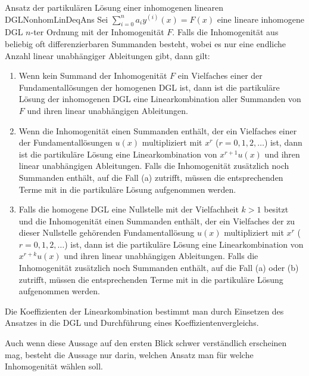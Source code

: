 \begin{statement}{Ansatz der partikulären Lösung einer inhomogenen linearen DGL}{NonhomLinDeqAns}
    Sei $\sum\limits_{i=0}^n a_i y^{(i)}(x) = F(x)$  eine lineare inhomogene DGL $n$-ter Ordnung mit der Inhomogenität $F$. Falls die Inhomogenität aus beliebig oft differenzierbaren Summanden besteht, wobei es nur eine endliche Anzahl linear unabhängiger Ableitungen gibt, dann gilt:
    \begin{enumerate}[label=\alph*)]
        \item Wenn kein Summand der Inhomogenität $F$ ein Vielfaches einer der Fundamentallösungen der homogenen DGL ist, dann ist die partikuläre Lösung der inhomogenen DGL eine Linearkombination aller Summanden von $F$ und ihren linear unabhängigen Ableitungen.
        \item Wenn die Inhomogenität einen Summanden enthält, der ein Vielfaches einer der Fundamentallösungen $u(x)$ multipliziert mit $x^r$ ($r=0,1,2,\dots$) ist, dann ist die partikuläre Lösung eine Linearkombination von $x^{r+1} u(x)$ und ihren linear unabhängigen Ableitungen. Falls die Inhomogenität zusätzlich noch Summanden enthält, auf die Fall (a) zutrifft, müssen die entsprechenden Terme mit in die partikuläre Lösung aufgenommen werden.
        \item Falls die homogene DGL eine Nullstelle mit der Vielfachheit $k>1$ besitzt und die Inhomogenität einen Summanden enthält, der ein Vielfaches der zu dieser Nullstelle gehörenden Fundamentallösung $u(x)$ multipliziert mit $x^r$ ($r=0,1,2,\dots$) ist, dann ist die partikuläre Lösung eine Linearkombination von $x^{r+k} u(x)$ und ihren linear unabhängigen Ableitungen. Falls die Inhomogenität zusätzlich noch Summanden enthält, auf die Fall (a) oder (b) zutrifft, müssen die entsprechenden Terme mit in die partikuläre Lösung aufgenommen werden.
    \end{enumerate}
    Die Koeffizienten der Linearkombination bestimmt man durch Einsetzen des Ansatzes in die DGL und Durchführung eines Koeffizientenvergleichs.
\end{statement}

Auch wenn diese Aussage auf den ersten Blick schwer verständlich erscheinen mag, besteht die Aussage nur darin, welchen Ansatz man für welche Inhomogenität wählen soll.

